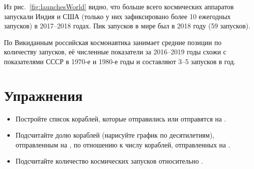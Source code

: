 Из рис.~\ref{fig:launchesWorld} видно, что больше всего космических аппаратов 
запускали Индия и США 
(только у них зафиксировано более 10 ежегодных запусков) в 2017--2018 годах. 
Пик запусков в мире был в 2018 году (59 запусков). 

По Викиданным российская космонавтика занимает средние позиции по количеству запусков, 
её численные показатели за 2016--2019 годы схожи с показателями СССР в 1970-е и 1980-е годы 
и составляют 3--5 запусков в год.

\section{Упражнения}
\begin{itemize}
  \item Постройте список кораблей, которые отправились или отправятся на .
  \item Подсчитайте долю кораблей (нарисуйте график по десятилетиям), 
        отправленным на , 
        по отношению к числу кораблей, отправленных на .
  \item Подсчитайте количество  космических запусков 
      относительно .%
%
\end{itemize}
